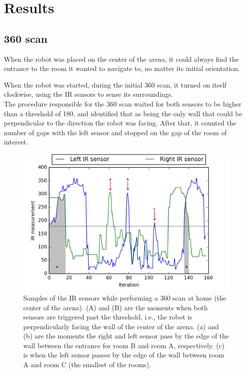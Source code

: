 \section{Results}

\subsection{360 scan}

When the robot was placed on the center of the arena, it could always find the entrance to the room it wanted to navigate to, no matter its initial orientation.

When the robot was started, during the initial 360 scan, it turned on itself clockwise, using the IR sensors to sense its surroundings.\\
The procedure responsible for the 360 scan waited for both sensors to be higher than a threshold of 180, and identified that as being the only wall that could be perpendicular to the direction the robot was facing. After that, it counted the number of gaps with the left sensor and stopped on the gap of the room of interest.

\begin{figure}[ht]
    \centering
    \includegraphics[width=0.7\linewidth]{res/360-scan-plot.png}
    \caption{Samples of the IR sensors while performing a 360 scan at home (the center of the arena). (A) and (B) are the moments when both sensors are triggered past the threshold, i.e., the robot is perpendicularly facing the wall of the center of the arena. (a) and (b) are the moments the right and left sensor pass by the edge of the wall between the entrance for room B and room A, respectively. (c) is when the left sensor passes by the edge of the wall between room A and room C (the smallest of the rooms).}
\end{figure}


